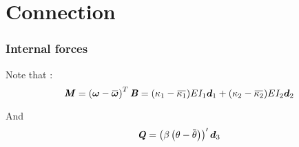 \section{Connection}


\subsubsection{Internal forces}

Note that :
\begin{equation}
	\mat{M} = \left(\vect{\omega} - \overbar{\vect{\omega}}\right)^T \mat{B} 
	= (\kappa_1 - \overbar{\kappa_1})EI_1\vect{d}_1 + (\kappa_2 - \overbar{\kappa_2})EI_2\vect{d}_2
\end{equation}

And
\begin{equation}
	\mat{Q} = \left(\beta\left(\theta - \overbar{\theta}\right)\right)' \vect{d}_3
\end{equation}



